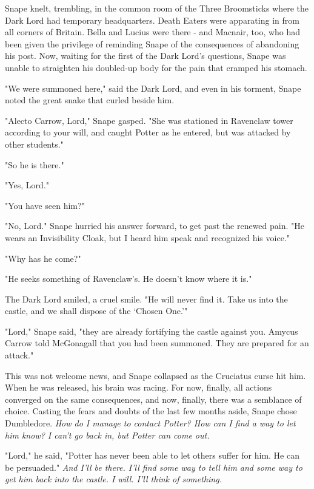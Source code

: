 \sbreak

Snape knelt, trembling, in the common room of the Three Broomsticks where the Dark Lord had temporary headquarters. Death Eaters were apparating in from all corners of Britain. Bella and Lucius were there - and Macnair, too, who had been given the privilege of reminding Snape of the consequences of abandoning his post. Now, waiting for the first of the Dark Lord's questions, Snape was unable to straighten his doubled-up body for the pain that cramped his stomach.

"We were summoned here," said the Dark Lord, and even in his torment, Snape noted the great snake that curled beside him.

"Alecto Carrow, Lord," Snape gasped. "She was stationed in Ravenclaw tower according to your will, and caught Potter as he entered, but was attacked by other students."

"So he is there."

"Yes, Lord."

"You have seen him?"

"No, Lord." Snape hurried his answer forward, to get past the renewed pain. "He wears an Invisibility Cloak, but I heard him speak and recognized his voice."

"Why has he come?"

"He seeks something of Ravenclaw's. He doesn't know where it is."

The Dark Lord smiled, a cruel smile. "He will never find it. Take us into the castle, and we shall dispose of the `Chosen One.'"

"Lord," Snape said, "they are already fortifying the castle against you. Amycus Carrow told McGonagall that you had been summoned. They are prepared for an attack."

This was not welcome news, and Snape collapsed as the Cruciatus curse hit him. When he was released, his brain was racing. For now, finally, all actions converged on the same consequences, and now, finally, there was a semblance of choice. Casting the fears and doubts of the last few months aside, Snape chose Dumbledore. \emph{How do I manage to contact Potter? How can I find a way to let him know? I can't go back in, but Potter can come out.}

"Lord," he said, "Potter has never been able to let others suffer for him. He can be persuaded." \emph{And I'll be there. I'll find some way to tell him and some way to get him back into the castle. I will. I'll think of something.}

